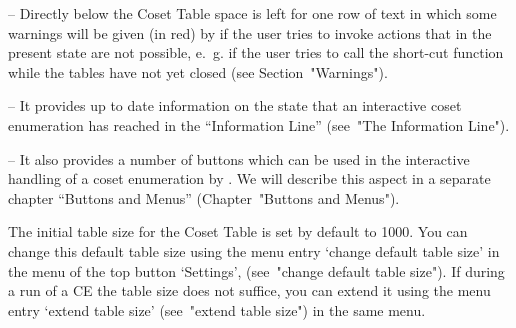 \item{--}
  Directly below the Coset Table space is left for one row of text in
  which some warnings will be given (in red) by {\ITC} if the user tries
  to invoke actions that in the present state are not possible, e.~g. if
  the user tries to call the short-cut function while the tables have
  not yet closed (see Section~"Warnings").

\item{--}
  It provides up to date information on the state that an interactive
  coset enumeration has reached in the ``Information Line'' (see~"The
  Information Line").

\item{--}
  It also provides a number of buttons which can be used in the
  interactive handling of a coset enumeration by {\ITC}. We will
  describe this aspect in a separate chapter ``Buttons and Menus''
  (Chapter~"Buttons and Menus").

\endlist

The initial table size for the {\ITC} Coset Table is set by default to
1000. You can change this default table size using the menu entry
`change default table size' in the menu of the top button `Settings',
(see~"change default table size"). If during a run of a CE the table
size does not suffice, you can extend it using the menu entry `extend
table size' (see~"extend table size") in the same menu.



